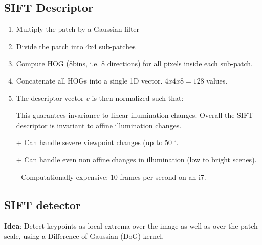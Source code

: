 \documentclass[10pt,a4paper]{scrartcl}
\begin{document}
\begin{multicols*}{2}
\begin{enumerate}
\begin{enumerate}
\end{enumerate}

\end{enumerate}

\subsection{SIFT Descriptor}

\begin{enumerate}
\item Multiply the patch by a Gaussian filter
\item Divide the patch into 4x4 sub-patches
\item Compute HOG (8bins, i.e. 8 directions) for all pixels inside each sub-patch.
\item Concatenate all HOGs into a single 1D vector. $4x4x8=128$ values.
\item The descriptor vector $v$ is then normalized such that:

This guarantees invariance to linear illumination changes. Overall the SIFT descriptor is invariant to affine illumination changes.
\end{enumerate}

\begin{itemize}
\item [+] Can handle severe viewpoint changes (up to $\SI{50}{\degree}$.
\item [+] Can handle even non affine changes in illumination (low to bright scenes).
\item [-] Computationally expensive: 10 frames per second on an i7.
\end{itemize}

\subsection{SIFT detector}

\textbf{Idea}: Detect keypoints as local extrema over the image as well as over the patch scale, using a Difference of Gaussian (DoG) kernel.


\end{multicols*}
\end{document}
